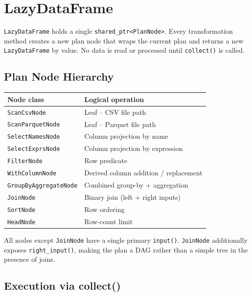 \documentclass[12pt,a4paper]{article}
\begin{document}
\section{LazyDataFrame}

\texttt{LazyDataFrame} holds a single \texttt{shared\_ptr<PlanNode>}.
Every transformation method creates a new plan node that wraps the current
plan and returns a new \texttt{LazyDataFrame} by value.  No data is
read or processed until \texttt{collect()} is called.

\subsection{Plan Node Hierarchy}

\begin{center}
\begin{tabular}{ll}
\toprule
\textbf{Node class} & \textbf{Logical operation} \\
\midrule
\texttt{ScanCsvNode}           & Leaf -- CSV file path \\
\texttt{ScanParquetNode}       & Leaf -- Parquet file path \\
\texttt{SelectNamesNode}       & Column projection by name \\
\texttt{SelectExprsNode}       & Column projection by expression \\
\texttt{FilterNode}            & Row predicate \\
\texttt{WithColumnNode}        & Derived column addition / replacement \\
\texttt{GroupByAggregateNode}  & Combined group-by + aggregation \\
\texttt{JoinNode}              & Binary join (left + right inputs) \\
\texttt{SortNode}              & Row ordering \\
\texttt{HeadNode}              & Row-count limit \\
\bottomrule
\end{tabular}
\end{center}

All nodes except \texttt{JoinNode} have a single primary \texttt{input()}.
\texttt{JoinNode} additionally exposes \texttt{right\_input()}, making the
plan a DAG rather than a simple tree in the presence of joins.

\subsection{Execution via collect()}
\end{document}
